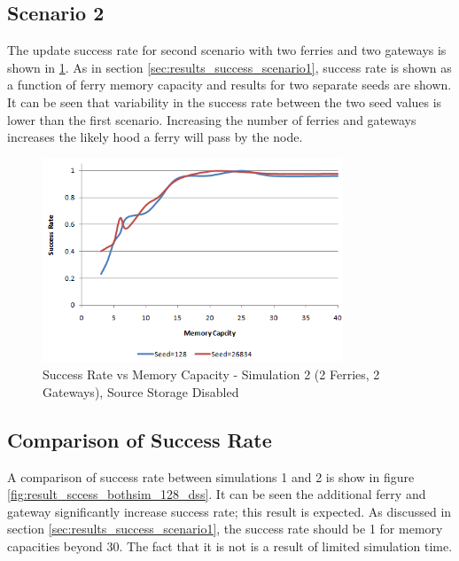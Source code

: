 \subsection{Scenario 2}
\label{sec:results_success_s2}

The update success rate for second scenario with two ferries and two gateways is shown in \ref{fig:result_sccess_sim2byseed_dss}.
As in section \ref{sec:results_success_scenario1}, success rate is shown as a function of ferry memory capacity and results for two separate seeds are shown.
It can be seen that variability in the success rate between the two seed values is lower than the first scenario.
Increasing the number of ferries and gateways increases the likely hood a ferry will pass by the node.

\begin{figure}[htbp]
    \centering
    \includegraphics[width=0.8\textwidth]{images/result_sccess_sim2byseed_dss}
    \caption{Success Rate vs Memory Capacity - Simulation 2 (2 Ferries, 2 Gateways), Source Storage Disabled}
    \label{fig:result_sccess_sim2byseed_dss}
\end{figure}

\subsection{Comparison of Success Rate}

A comparison of success rate between simulations 1 and 2 is show in figure \ref{fig:result_sccess_bothsim_128_dss}.
It can be seen the additional ferry and gateway significantly increase success rate; this result is expected.
As discussed in section \ref{sec:results_success_scenario1}, the success rate should be 1 for memory capacities beyond 30. 
The fact that it is not is a result of limited simulation time.

